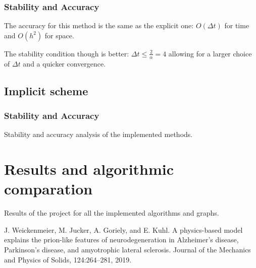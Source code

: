\documentclass[12pt, letterpaper]{article}
\begin{document}
\subsubsection{Stability and Accuracy}
The accuracy for this method is the same as the explicit one: $O(\Delta t)$ for time and $O(h^2)$ for space.

\noindent The stability condition though is better: $\Delta t\leq\frac2\alpha=4$ allowing for a larger choice of $\Delta t$ and a quicker convergence.

\subsection{Implicit scheme}
\subsubsection{Stability and Accuracy}

Stability and accuracy analysis of the implemented methods.

\section{Results and algorithmic comparation}
Results of the project for all the implemented algorithms and graphs.

\begin{thebibliography}{9}
    J. Weickenmeier, M. Jucker, A. Goriely, and E. Kuhl. A physics-based model explains the prion-like features of neurodegeneration in Alzheimer’s disease, Parkinson’s disease, and amyotrophic lateral sclerosis. Journal of the Mechanics and
    Physics of Solids, 124:264–281, 2019.
\end{thebibliography}
\end{document}
